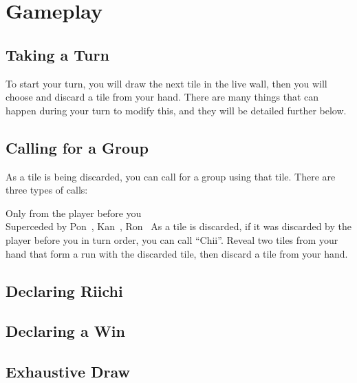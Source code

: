 \section{Gameplay}\label{core:sec:gameplay}

\subsection{Taking a Turn}\label{core:ssec:taking-a-turn}

To start your turn, you will draw the next tile in the live wall, then you will choose and discard a tile from your hand. There are many things that can happen during your turn to modify this, and they will be detailed further below.

\subsection{Calling for a Group}\label{core:ssec:calling}

As a tile is being discarded, you can call for a group using that tile. There are three types of calls:

	{\symbalert Only from the player before you \\
	\symbnegate Superceded by Pon~, Kan~, Ron~}
	{As a tile is discarded, if it was discarded by the player before you in turn order, you can call ``Chii''. Reveal two tiles from your hand that form a run with the discarded tile, then discard a tile from your hand.}

\subsection{Declaring Riichi}\label{core:ssec:declaring-riichi}

\subsection{Declaring a Win}\label{core:ssec:declaring-a-win}

\subsection{Exhaustive Draw}\label{core:ssec:exhaustive-draw}
